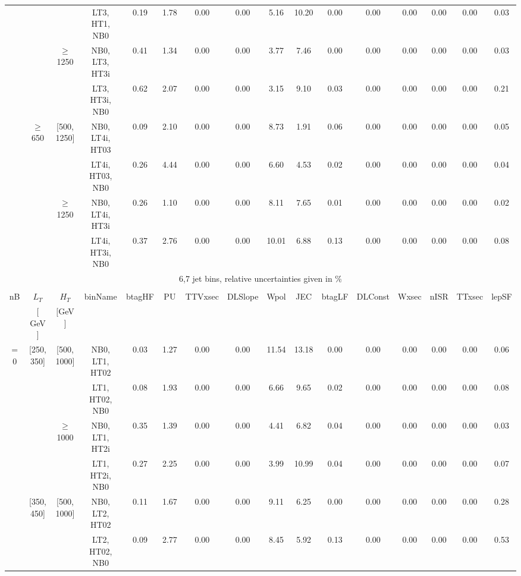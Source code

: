 \begin{sidewaystable}[ht]
\begin{center}
\begin{tabular}{|c | c | c | c | c | c | c | c | c | c | c | c | c | c | c | c | }
  &  &  &LT3, HT1, NB0 & 0.19 & 1.78 & 0.00 & 0.00 & 5.16 & 10.20 & 0.00 & 0.00 & 0.00 & 0.00 & 0.00 & 0.03 \\ 
\cline{3-16}  & & $\geq$ 1250 &NB0, LT3, HT3i & 0.41 & 1.34 & 0.00 & 0.00 & 3.77 & 7.46 & 0.00 & 0.00 & 0.00 & 0.00 & 0.00 & 0.03 \\ 
  &  &  &LT3, HT3i, NB0 & 0.62 & 2.07 & 0.00 & 0.00 & 3.15 & 9.10 & 0.03 & 0.00 & 0.00 & 0.00 & 0.00 & 0.21 \\ 
\cline{2-16}   & $\geq$ 650 & [500, 1250]&NB0, LT4i, HT03 & 0.09 & 2.10 & 0.00 & 0.00 & 8.73 & 1.91 & 0.06 & 0.00 & 0.00 & 0.00 & 0.00 & 0.05 \\ 
  &  &  &LT4i, HT03, NB0 & 0.26 & 4.44 & 0.00 & 0.00 & 6.60 & 4.53 & 0.02 & 0.00 & 0.00 & 0.00 & 0.00 & 0.04 \\ 
\cline{3-16}  & & $\geq$ 1250 &NB0, LT4i, HT3i & 0.26 & 1.10 & 0.00 & 0.00 & 8.11 & 7.65 & 0.01 & 0.00 & 0.00 & 0.00 & 0.00 & 0.02 \\ 
  &  &  &LT4i, HT3i, NB0 & 0.37 & 2.76 & 0.00 & 0.00 & 10.01 & 6.88 & 0.13 & 0.00 & 0.00 & 0.00 & 0.00 & 0.08 \\ 
 \hline 
\multicolumn{16}{|c|}{6,7 jet bins, relative uncertainties given in \%} \\ 
\multicolumn{16}{|c|}{} \\ \hline 
nB &  $L_T$ & $H_T$ & binName & btagHF & PU & TTVxsec & DLSlope & Wpol & JEC & btagLF & DLConst & Wxsec & nISR & TTxsec & lepSF  \\ 
   & $[$ GeV $]$  &  $[$GeV$]$  &  &  &  &  &  &  &  &  &  &  &  &  &   \\ \hline 
\cline{1-16} $=$ 0 & [250, 350] & [500, 1000]&NB0, LT1, HT02 & 0.03 & 1.27 & 0.00 & 0.00 & 11.54 & 13.18 & 0.00 & 0.00 & 0.00 & 0.00 & 0.00 & 0.06 \\ 
  &  &  &LT1, HT02, NB0 & 0.08 & 1.93 & 0.00 & 0.00 & 6.66 & 9.65 & 0.02 & 0.00 & 0.00 & 0.00 & 0.00 & 0.08 \\ 
\cline{3-16}  & & $\geq$ 1000 &NB0, LT1, HT2i & 0.35 & 1.39 & 0.00 & 0.00 & 4.41 & 6.82 & 0.04 & 0.00 & 0.00 & 0.00 & 0.00 & 0.03 \\ 
  &  &  &LT1, HT2i, NB0 & 0.27 & 2.25 & 0.00 & 0.00 & 3.99 & 10.99 & 0.04 & 0.00 & 0.00 & 0.00 & 0.00 & 0.07 \\ 
\cline{2-16}   & [350, 450] & [500, 1000]&NB0, LT2, HT02 & 0.11 & 1.67 & 0.00 & 0.00 & 9.11 & 6.25 & 0.00 & 0.00 & 0.00 & 0.00 & 0.00 & 0.28 \\ 
  &  &  &LT2, HT02, NB0 & 0.09 & 2.77 & 0.00 & 0.00 & 8.45 & 5.92 & 0.13 & 0.00 & 0.00 & 0.00 & 0.00 & 0.53 \\ 

\end{tabular}
\end{center}
\end{sidewaystable}

